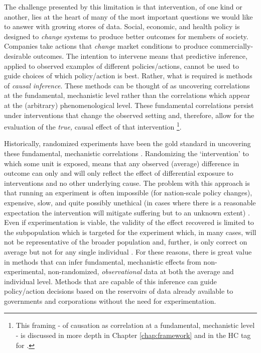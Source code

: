 \documentclass[../main.tex]{subfiles}
\begin{document}
\vspace{\baselineskip}
The challenge presented by this limitation is that intervention, of one kind or another, lies at the heart of many of the most important questions we would like to answer with growing stores of data. Social, economic, and health policy is designed to \textit{change} systems to produce better outcomes for members of society. Companies take actions that \textit{change} market conditions to produce commercially-desirable outcomes. The intention to intervene means that predictive inference, applied to observed examples of different policies/actions, cannot be used to guide choices of which policy/action is best. Rather, what is required is methods of \textit{causal inference}. These methods can be thought of as uncovering correlations at the fundamental, mechanistic level rather than the correlations which appear at the (arbitrary) phenomenological level. These fundamental correlations persist under interventions that change the observed setting and, therefore, allow for the evaluation of the \textit{true, }causal\textit{ }effect of that intervention \parencite{Scholkopf2019CausalityLearning} \footnote{This framing - of causation as correlation at a fundamental, mechanistic level - is discussed in more depth in Chapter \ref{chap:framework} and in the HC tag for .}.\par


\vspace{\baselineskip}
Historically, randomized experiments have been the gold standard in uncovering these fundamental, mechanistic correlations \parencite{Meldrum2000AStandard}. Randomizing the ‘intervention’ to which some unit is exposed, means that any observed (average) difference in outcome can only and will only reflect the effect of differential exposure to interventions and no other underlying cause. The problem with this approach is that running an experiment is often impossible (for nation-scale policy changes), expensive, slow, and quite possibly unethical (in cases where there is a reasonable expectation the intervention will mitigate suffering but to an unknown extent) \parencite{Meldrum2000AStandard}. Even if experimentation is viable, the validity of the effect recovered is limited to the subpopulation which is targeted for the experiment which, in many cases, will not be representative of the broader population and, further, is only correct on average but not for any single individual \parencite{Rothwell2006FactorsTrials}. For these reasons, there is great value in methods that can infer fundamental, mechanistic effects from non-experimental, non-randomized, \textit{observational} data at both the average and individual level. Methods that are capable of this inference can guide policy/action decisions based on the reservoirs of data already available to governments and corporations without the need for experimentation.\par
\end{document}
